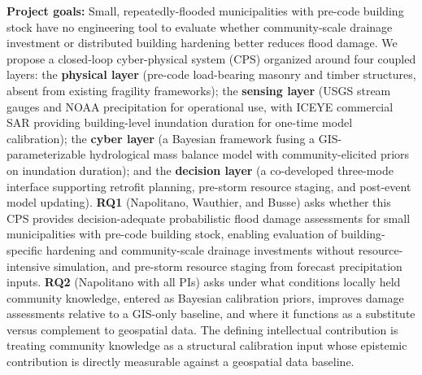 \documentclass[11pt]{article}
\begin{document}
\setlength{\baselineskip}{12.6pt}
\setlength{\normalbaselineskip}{12.6pt}


\begin{tcolorbox}[colback=mycmykcolor, colframe=black, boxrule=1pt, coltext=black]
\textbf{Project goals:}
Small, repeatedly-flooded municipalities with pre-code building stock have no
engineering tool to evaluate whether community-scale drainage investment or distributed
building hardening better reduces flood damage.
We propose a closed-loop cyber-physical system (CPS) organized around four coupled layers:
the \textbf{physical layer} (pre-code load-bearing masonry and timber structures,
absent from existing fragility frameworks);
the \textbf{sensing layer} (USGS stream gauges and NOAA precipitation for operational
use, with ICEYE commercial SAR providing building-level inundation duration for
one-time model calibration);
the \textbf{cyber layer} (a Bayesian framework fusing a GIS-parameterizable hydrological
mass balance model with community-elicited priors on inundation duration); and
the \textbf{decision layer} (a co-developed three-mode interface supporting retrofit
planning, pre-storm resource staging, and post-event model updating).
\textbf{RQ1} (Napolitano, Wauthier, and Busse) asks whether this CPS provides
decision-adequate probabilistic flood damage assessments for small municipalities
with pre-code building stock, enabling evaluation of building-specific hardening
and community-scale drainage investments without resource-intensive simulation,
and pre-storm resource staging from forecast precipitation inputs.
\textbf{RQ2} (Napolitano with all PIs) asks under what conditions locally held
community knowledge, entered as Bayesian calibration priors, improves damage
assessments relative to a GIS-only baseline, and where it functions as a substitute
versus complement to geospatial data.
The defining intellectual contribution is treating community knowledge as a structural
calibration input whose epistemic contribution is directly measurable against a
geospatial data baseline.
\end{tcolorbox}
\vspace{-0.5cm}
\end{document}

